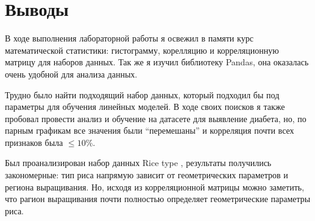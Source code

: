 \section{Выводы}
В ходе выполнения лабораторной работы я освежил в памяти курс математической статистики: гистограмму, корелляцию и корреляционную матрицу 
для наборов данных. Так же я изучил библиотеку Pandas, она оказалась очень удобной для анализа данных.

Трудно было найти подходящий набор данных, который подходил бы под параметры для обучения линейных моделей. В ходе своих поисков я также пробовал
провести анализ и обучение на датасете для выявление диабета, но, по парным графикам все значения были \enquote{перемешаны} и корреляция почти 
всех признаков была  $\le 10\%$.

Был проанализирован набор данных Rice type \cite{kaggle}, результаты получились закономерные: тип риса напрямую зависит от геометрических параметров 
и региона выращивания. Но, исходя из корреляционной матрицы можно заметить, что рагион выращивания почти полностью определяет геометрические параметры
риса.
\pagebreak
